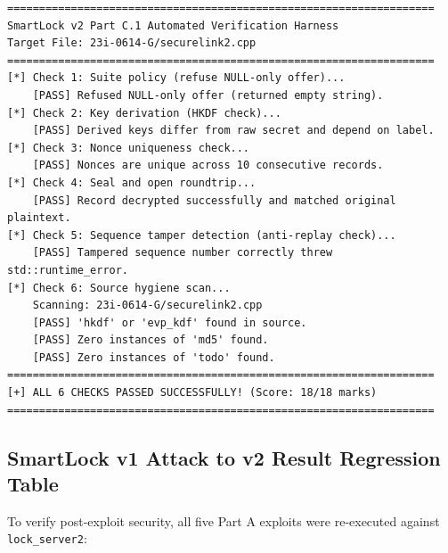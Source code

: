 \documentclass[11pt,a4paper]{article}
\begin{document}
\begin{lstlisting}[caption={Part C.1 Verification Output (\texttt{evidence/partc\_v2/c1\_selfcheck\_output.txt})}]
===================================================================
SmartLock v2 Part C.1 Automated Verification Harness
Target File: 23i-0614-G/securelink2.cpp
===================================================================
[*] Check 1: Suite policy (refuse NULL-only offer)...
    [PASS] Refused NULL-only offer (returned empty string).
[*] Check 2: Key derivation (HKDF check)...
    [PASS] Derived keys differ from raw secret and depend on label.
[*] Check 3: Nonce uniqueness check...
    [PASS] Nonces are unique across 10 consecutive records.
[*] Check 4: Seal and open roundtrip...
    [PASS] Record decrypted successfully and matched original plaintext.
[*] Check 5: Sequence tamper detection (anti-replay check)...
    [PASS] Tampered sequence number correctly threw std::runtime_error.
[*] Check 6: Source hygiene scan...
    Scanning: 23i-0614-G/securelink2.cpp
    [PASS] 'hkdf' or 'evp_kdf' found in source.
    [PASS] Zero instances of 'md5' found.
    [PASS] Zero instances of 'todo' found.
===================================================================
[+] ALL 6 CHECKS PASSED SUCCESSFULLY! (Score: 18/18 marks)
===================================================================
\end{lstlisting}

\subsection{SmartLock v1 Attack to v2 Result Regression Table}
To verify post-exploit security, all five Part A exploits were re-executed against \texttt{lock\_server2}:
\end{document}
